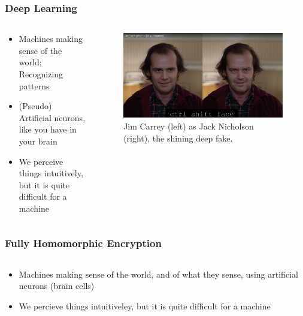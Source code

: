 \documentclass[aspectratio=169]{beamer}
\begin{document}
  \begin{frame}
    \frametitle{Deep Learning}
    \begin{columns}
      \begin{column}{0.5\textwidth}
        \begin{itemize}
          \item Machines making sense of the world; Recognizing patterns
          \item (Pseudo) Artificial neurons, like you have in your brain
          \item We perceive things intuitively, but it is quite difficult for a machine
        \end{itemize}
      \end{column}
      \begin{column}{0.5\textwidth}
        \begin{figure}[th!]
          \centering
          \includegraphics[width=1\textwidth]{jim_carrey.png}
          \caption{Jim Carrey (left) as Jack Nicholson (right), the shining deep fake.\autocite{deepfake}}
          \label{fig:jim_carrey}
        \end{figure}
      \end{column}
    \end{columns}
  \end{frame}

  \begin{frame}
    \frametitle{Fully Homomorphic Encryption}
    \begin{columns}
      \begin{column}{0.5\textwidth}
        \begin{itemize}
          \item Machines making sense of the world, and of what they sense, using artificial neurons (brain cells)
          \item We percieve things intuitiveley, but it is quite difficult for a machine
        \end{itemize}
      \end{column}
    \end{columns}
  \end{frame}
\end{document}
